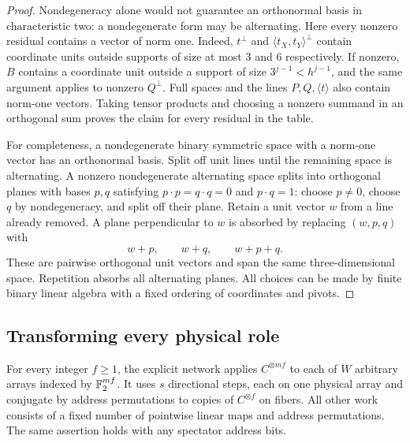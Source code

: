 \begin{proof}
Nondegeneracy alone would not guarantee an orthonormal basis in
characteristic two: a nondegenerate form may be alternating.  Here
every nonzero residual contains a vector of norm one.  Indeed,
$t^\perp$ and $\langle t_X,t_Y\rangle^\perp$ contain coordinate
units outside supports of size at most $3$ and $6$ respectively.
If nonzero, $B$ contains a coordinate unit outside a support of
size $3^{j-1}<h^{j-1}$, and the same argument applies to nonzero
$Q^\perp$.  Full spaces and the lines $P,Q,\langle t\rangle$
also contain norm-one vectors.  Taking tensor products and choosing
a nonzero summand in an orthogonal sum proves the claim for every
residual in the table.

For completeness, a nondegenerate binary symmetric space with a
norm-one vector has an orthonormal basis.  Split off unit lines
until the remaining space is alternating.  A nonzero nondegenerate
alternating space splits into orthogonal planes with bases $p,q$
satisfying $p\cdot p=q\cdot q=0$ and $p\cdot q=1$: choose $p\ne0$,
choose $q$ by nondegeneracy, and split off their plane.  Retain a
unit vector $w$ from a line already removed.  A plane perpendicular
to $w$ is absorbed by replacing $(w,p,q)$ with
\[
 w+p,\qquad w+q,\qquad w+p+q.
\]
These are pairwise orthogonal unit vectors and span the same
three-dimensional space.  Repetition absorbs all alternating
planes.  All choices can be made by finite binary linear algebra
with a fixed ordering of coordinates and pivots.
\end{proof}

\subsection{Transforming every physical role}

\begin{proposition}\label{net:finite-interface}
For every integer $f\ge1$, the explicit network applies
$C^{\otimes mf}$ to each of $W$ arbitrary arrays indexed by
$\mathbb F_2^{mf}$.  It uses $s$ directional steps, each on one physical
array and conjugate by address permutations to copies of
$C^{\otimes f}$ on fibers.  All other work consists of a fixed
number of pointwise linear maps and address permutations.  The
same assertion holds with any spectator address bits.
\end{proposition}

